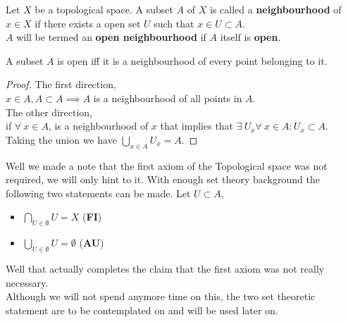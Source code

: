 \documentclass{scrartcl} %
\begin{document}
\begin{definition}[Neighbourhoods]
Let $X$ be a topological space. A subset $A$ of $X$ is
called a \textbf{neighbourhood} of $x \in X$ if there
exists a open set $U$ such that $x \in U \subset A$.\\
$A$ will be termed an \textbf{open neighbourhood} if $A$
itself is \textbf{open}.
\begin{remark}
A subset $A$ is open iff it is a neighbourhood of every point belonging to it.
\end{remark}
\begin{proof}
The first direction, \\
$x \in A, A \subset A \implies A$ is a neighbourhood of all points in $A$.\\
The other direction, \\
if $\forall\ x \in A$, is a neighbourhood of $x$ that
implies that $\exists\ U_x \forall\ x \in A : U_x 
\subset A$. Taking the union we have $\bigcup_{x \in A}
U_x = A$.
\end{proof}
\end{definition}
\newpage
\begin{remark}
Well we made a note that the first axiom of the
Topological space was not required, we will only hint to
it. With enough set theory background the following two
statements can be made. Let $U \subset A$,
\begin{itemize}
	\item $\bigcap\limits_{U \in \emptyset} U = X$
		(\textbf{FI})
	\item $\bigcup\limits_{U \in \emptyset} U =
		\emptyset$ (\textbf{AU})
\end{itemize}
Well that actually completes the claim that the first
axiom was not really necessary.\\ Although we will not
spend anymore time on this, the two set theoretic
statement are to be contemplated on and will be used 
later on.
\end{remark}
\end{document}
